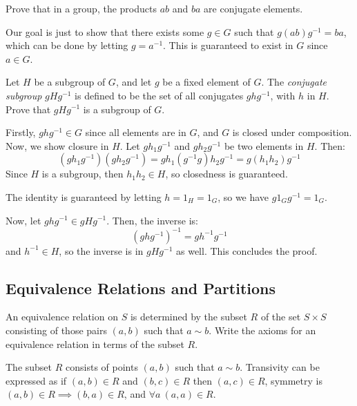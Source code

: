 \documentclass[10pt]{article}
\begin{document}
\begin{problem}
	Prove that in a group, the products \( ab \) and \( ba \) are conjugate elements. 
\end{problem}

\begin{solution}
	Our goal is just to show that there exists some \( g \in G \) such that 
	\( g(ab) g^{-1} = ba \), which can be done by letting \( g = a^{-1} \). This 
	is guaranteed to exist in \( G \) since \( a \in G \). 
\end{solution}

\begin{problem}
	Let \( H \) be a subgroup of \( G \), and let \( g \) be a fixed element of \( G \).
	The \textit{conjugate subgroup} \( gHg^{-1} \) is defined to be the set of all 
	conjugates \( ghg^{-1} \), with \( h \) in \( H \). Prove that \( gHg^{-1} \) is a 
	subgroup of \( G \). 
\end{problem}

\begin{solution}
	Firstly, \( ghg^{-1} \in G \) since all elements are in \( G \), and \( G \) is 
	closed under composition. Now, we show closure in \( H \). Let 
	\( gh_1g^{-1} \) and \( gh_2g^{-1} \) be two elements in \( H \). Then:
	\[
		(gh_1g^{-1})(gh_2g^{-1}) = gh_1(g^{-1}g)h_2g^{-1} = g(h_1h_2)g^{-1} 
	\] 
	Since \( H \) is a subgroup, then  \( h_1h_2 \in H \), so closedness is guaranteed. 

	The identity is guaranteed by letting \( h = 1_H = 1_G\), so we have 
	\( g 1_G g^{-1} = 1_G\). 

	Now, let \( ghg^{-1} \in gHg^{-1} \). Then, the inverse is:
	\[
		(ghg^{-1})^{-1} = gh^{-1}g^{-1}
	\] 
	and \( h^{-1} \in H \), so the inverse is in \( gHg^{-1} \) as well. This concludes
	the proof. 
\end{solution}

\subsection{Equivalence Relations and Partitions}

\begin{problem}
	An equivalence relation on \( S \) is determined by the subset \( R \) of 
	the set \( S \times S \) consisting of those pairs \( (a, b) \) such that 
	\( a \sim b \). Write the axioms for an equivalence relation in 
	terms of the subset \( R \). 
\end{problem}

\begin{solution}
	The subset \( R \) consists of points \( (a,b) \) such that \( a \sim b \). 
	Transivity can be expressed as if \( (a, b) \in R \) and \( (b, c) \in R \) then 
	\( (a, c) \in R \), symmetry is \( (a, b) \in R \implies (b, a) \in R \), and 
	\( \forall a \ (a, a) \in R \). 
\end{solution}
\end{document}
